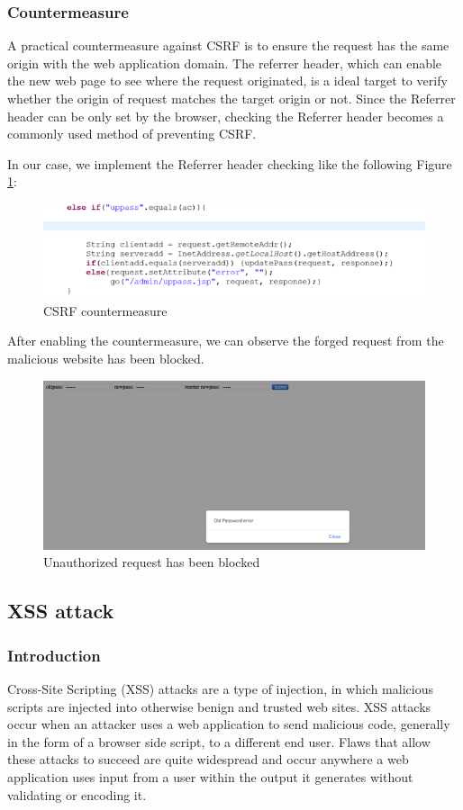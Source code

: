 \subsubsection{Countermeasure}


A practical countermeasure against CSRF is to ensure the request has the same origin with the web application domain. The referrer header, which can enable the new web page to see where the request originated, is a ideal target to verify whether the origin of request matches the target origin or not.  Since the Referrer header can be only set by the browser, checking the Referrer header becomes a commonly used method of preventing CSRF. 

In our case, we implement the Referrer header checking like the following Figure \ref{fig:s9}:
\begin{figure}[H]
    \centering
    \includegraphics[width=\textwidth]{sp/sp9.png}
    \caption{CSRF countermeasure}
    \label{fig:s9}
\end{figure}
After enabling the countermeasure, we can observe the forged request from the malicious website has been blocked.
\begin{figure}[H]
    \centering
    \includegraphics[width=\textwidth]{sp/sp10.png}
    \caption{Unauthorized request has been blocked}
    \label{fig:s10}
\end{figure}
\subsection{XSS attack}
\subsubsection{Introduction}
Cross-Site Scripting (XSS) attacks are a type of injection, in which malicious scripts are injected into otherwise benign and trusted web sites. XSS attacks occur when an attacker uses a web application to send malicious code, generally in the form of a browser side script, to a different end user. Flaws that allow these attacks to succeed are quite widespread and occur anywhere a web application uses input from a user within the output it generates without validating or encoding it.

